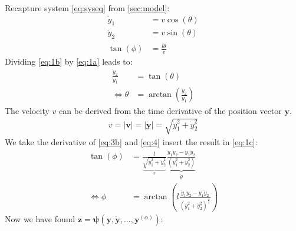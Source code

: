 \documentclass[a4paper,11pt,headings=standardclasses,parskip=half]{scrartcl}
\newcommand{\y}{\mathbf{y}}
\newcommand{\z}{\mathbf{z}}
\begin{document}
Recapture system \eqref{eq:syseq} from \autoref{sec:model}:
\setcounter{equation}{0}
\begin{subequations}
\label{eq:1}
\begin{align}
\dot{y}_1&=v \cos (\theta) \label{eq:1a}\\
\dot{y}_2&=v \sin (\theta) \label{eq:1b}\\
\tan(\phi) &= \frac{l\dot{\theta}}{v} \label{eq:1c}
\end{align}
\end{subequations}
\setcounter{equation}{2}
Dividing \eqref{eq:1b} by \eqref{eq:1a} leads to:
\begin{subequations}
\begin{align}
\frac{\dot{y}_2}{\dot{y}_1} &=\tan(\theta) \label{eq:3a}\\
\Leftrightarrow  \theta &= \arctan\left(\frac{\dot{y}_2}{\dot{y}_1}\right) \label{eq:3b}
\end{align}
\end{subequations}
The velocity $v$ can be derived from the time derivative of the position vector $\y$.
\begin{align}
\label{eq:4}
v =\left| \mathbf{v} \right| = \left| \dot{\y} \right| = \sqrt{\dot{y}_1^2+\dot{y}_2^2}
\end{align}
We take the derivative of \eqref{eq:3b} and \eqref{eq:4} insert the result in \eqref{eq:1c}:
\begin{subequations}
\begin{align}
\tan(\phi) &= \frac{l}{\underbrace{\sqrt{\dot{y}_1^2+\dot{y}_2^2}}_{v}} \underbrace{\frac{\ddot{y}_1 \dot{y}_2 - \dot{y}_1 \ddot{y}_2}{(\dot{y}_1^2+\dot{y}_2^2)}}_{\dot{\theta}}\label{eq:5a} \\
\Leftrightarrow \phi &= \arctan\left(l \frac{\ddot{y}_1 \dot{y}_2 - \dot{y}_1 \ddot{y}_2}{(\dot{y}_1^2+\dot{y}_2^2)^{\frac{3}{2}}} 
\right) \label{eq:5b}
\end{align}
\end{subequations}
Now we have found $\z = \mathbf{\psi}(\y,\dot{\y},...,\y^{(\alpha)})$:
\end{document}
